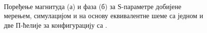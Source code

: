 \documentclass[main.tex]{subfiles}
\begin{document}
\begin{figure}[!t]
\centering
{}\\
\caption{Поређење магнитуда (а) и фаза (б) за $Ѕ$-параметре добијене мерењем, симулацијом и на основу еквивалентне шеме са једном и две П-ћелије за конфигурацију са .} 
\label{f11}
\end{figure}
\end{document}
